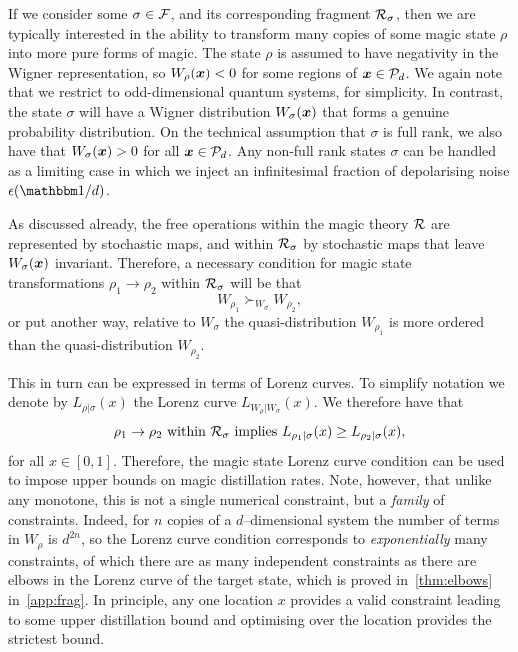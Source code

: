 \documentclass[pra,
aps,
twocolumn,
superscriptaddress,
groupedaddress,
nofootinbib,
reprint
]{revtex4-1}
\begin{document}
If we consider some $\sigma \in \mathcal{F}$, and its corresponding fragment $\mathcal{R}_\sigma$, then we are typically interested in the ability to transform many copies of some magic state $\rho$ into more pure forms of magic. The state $\rho$ is assumed to have negativity in the Wigner representation, so $W_\rho(\boldsymbol{x}) < 0$ for some regions of $\boldsymbol{x} \in {\mathcal P}_d$. We again note that we restrict to odd-dimensional quantum systems, for simplicity. In contrast, the state $\sigma$ will have a Wigner distribution $W_\sigma(\boldsymbol{x})$ that forms a genuine probability distribution. On the technical assumption that $\sigma$ is full rank, we also have that $W_\sigma(\boldsymbol{x}) > 0$ for all $\boldsymbol{x} \in {\mathcal P}_d$. Any non-full rank states $\sigma$ can be handled as a limiting case in which we inject an infinitesimal fraction of depolarising noise $\epsilon (\id/d)$.

As discussed already, the free operations within the magic theory $\mathcal{R}$ are represented by stochastic maps, and within $\mathcal{R}_\sigma$ by stochastic maps that leave $W_\sigma(\boldsymbol{x})$ invariant. Therefore, a necessary condition for magic state transformations $\rho_1 \rightarrow \rho_2$ within $\mathcal{R}_\sigma$ will be that 
\begin{equation}
W_{\rho_1} \succ_{W_{\sigma}} W_{\rho_2},
\end{equation}
or put another way, relative to $W_\sigma$ the quasi-distribution $W_{\rho_1}$ is more ordered than the quasi-distribution $W_{\rho_2}$. 

This in turn can be expressed in terms of Lorenz curves. To simplify notation we denote by $L_{\rho | \sigma}(x)$ the Lorenz curve $L_{W_{\rho} | W_{\sigma}} (x)$. We therefore have that
\begin{equation}
\rho_1 \rightarrow \rho_2 \mbox{ within }\mathcal{R}_\sigma \mbox{ implies } L_{\rho_1 |\sigma} (x) \ge L_{\rho_2 |\sigma} (x),
\end{equation}
for all $x \in [0,1]$. Therefore, the magic state Lorenz curve condition can be used to impose upper bounds on magic distillation rates. Note, however, that unlike any monotone, this is not a single numerical constraint, but a \emph{family} of constraints. Indeed, for $n$ copies of a $d$--dimensional system the number of terms in $W_{\rho}$ is $d^{2n}$, so the Lorenz curve condition corresponds to \emph{exponentially} many constraints, of which there are as many independent constraints as there are elbows in the Lorenz curve of the target state, which is proved in~\cref{thm:elbows} in~\cref{app:frag}.
In principle, any one location $x$ provides a valid constraint leading to some upper distillation bound and optimising over the location provides the strictest bound.
\end{document}
